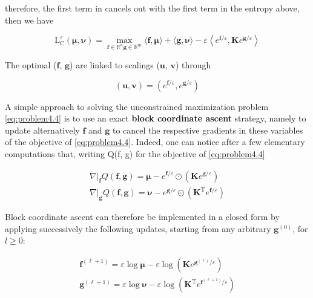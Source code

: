 therefore, the first term in \label{eq:fg} cancels out with the first term in the entropy above, then we have

\begin{equation}
  \label{eq:problem4.4}
  \mathrm{L}_{\mathrm{C}}^{\varepsilon}(\mathbf{\mu}, \mathbf{\nu})=\max _{\mathbf{f} \in \mathbb{R}^{n} \mathbf{g} \in \mathbb{R}^{m}}\langle\mathbf{f}, \mathbf{\mu}\rangle+\langle\mathbf{g}, \mathbf{\nu}\rangle-\varepsilon\left\langle e^{\mathbf{f} / \varepsilon}, \mathbf{K} e^{\mathbf{g} / \varepsilon}\right\rangle
\end{equation}

The optimal ($\mathbf{f}$, $\mathbf{g}$) are linked to scalings ($\mathbf{u}$, $\mathbf{v}$) through

\begin{equation}
  (\mathbf{u}, \mathbf{v})=\left(e^{\mathbf{f} / \varepsilon}, e^{\mathbf{g} / \varepsilon}\right)
\end{equation}

A simple approach to solving the unconstrained maximization problem \ref{eq:problem4.4} is to use an exact 
\textbf{block coordinate ascent} strategy, namely to update alternatively $\mathbf{f}$ and $\mathbf{g}$ to cancel the
respective gradients in these variables of the objective of \ref{eq:problem4.4}. Indeed, one can notice
after a few elementary computations that, writing Q(f, g) for the objective of \ref{eq:problem4.4}

\begin{equation}
  \begin{array}{l}
    {\left.\nabla\right|_{\mathbf{f}} Q(\mathbf{f}, \mathbf{g})=\mathbf{\mu}-e^{\mathbf{f} / \varepsilon} \odot\left(\mathbf{K} e^{\mathbf{g} / \varepsilon}\right)} \\
    {\left.\nabla\right|_{\mathbf{g}} Q(\mathbf{f}, \mathbf{g})=\mathbf{\nu}-e^{\mathbf{g} / \varepsilon} \odot\left(\mathbf{K}^{\mathrm{T}} e^{\mathbf{f} / \varepsilon}\right)}
    \end{array}
\end{equation}

Block coordinate ascent can therefore be implemented in a closed form by applying
successively the following updates, starting from any arbitrary $\mathbf{g}^{(0)}$, for $l \geq 0$:

\begin{equation}
  \begin{array}{l}
    {\mathbf{f}^{(\ell+1)}=\varepsilon \log \mathbf{\mu}-\varepsilon \log \left(\mathbf{K} e^{\mathbf{g}^{(\ell)} / \varepsilon}\right)} \\
    {\mathbf{g}^{(\ell+1)}=\varepsilon \log \mathbf{\nu}-\varepsilon \log \left(\mathbf{K}^{\mathrm{T}} e^{\mathbf{f}^{(\ell+1)} / \varepsilon}\right)}
    \end{array}
\end{equation}

